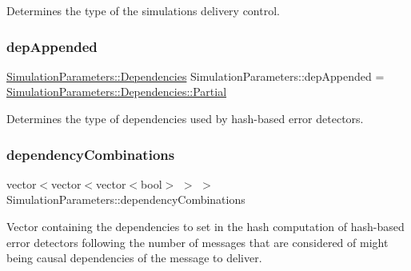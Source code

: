 Determines the type of the simulation\textquotesingle{}s delivery control. 

\mbox{\label{class_simulation_parameters_ad0c30ae3194fb07ca8a456331fce1add}} 
\subsubsection{\texorpdfstring{dep\+Appended}{depAppended}}
{\footnotesize\ttfamily \hyperlink{class_simulation_parameters_afb3b6aaecd4b19ef1991c870c8402dff}{Simulation\+Parameters\+::\+Dependencies} Simulation\+Parameters\+::dep\+Appended = \hyperlink{class_simulation_parameters_afb3b6aaecd4b19ef1991c870c8402dffa44ffd38a6dea695cbe2b34efdcc6cf27}{Simulation\+Parameters\+::\+Dependencies\+::\+Partial}\hspace{0.3cm}{\ttfamily [static]}}



Determines the type of dependencies used by hash-\/based error detectors. 

\mbox{\label{class_simulation_parameters_a1e884901020cad738db1aceaa6700d9f}} 
\subsubsection{\texorpdfstring{dependency\+Combinations}{dependencyCombinations}}
{\footnotesize\ttfamily vector$<$vector$<$vector$<$bool$>$ $>$ $>$ Simulation\+Parameters\+::dependency\+Combinations}



Vector containing the dependencies to set in the hash computation of hash-\/based error detectors following the number of messages that are considered of might being causal dependencies of the message to deliver. 

\mbox{\label{class_simulation_parameters_a069a04754400916fc6b5f9f5baff2d32}} 
